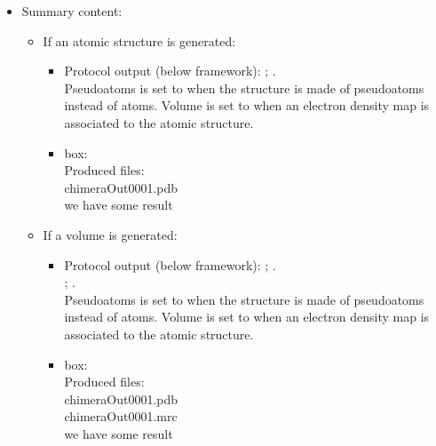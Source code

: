 \begin{itemize}
  \item Summary content:
  
   \begin{itemize}
    \item If an atomic structure is generated:

    \begin{itemize}
     \item Protocol output (below \scipion framework):
      ; .\\Pseudoatoms is set to  when the structure is made of pseudoatoms instead of atoms. Volume is set to  when an electron density map is associated to the atomic structure.\\
     \item {} box:\\Produced files:\\chimeraOut0001.pdb\\we have some result
    \end{itemize}
    \item If a volume is generated:
    
    \begin{itemize}
     \item Protocol output (below \scipion framework):
      ; .\\
      ; .\\Pseudoatoms is set to  when the structure is made of pseudoatoms instead of atoms. Volume is set to  when an electron density map is associated to the atomic structure.
     \item {} box:\\Produced files:\\chimeraOut0001.pdb\\chimeraOut0001.mrc\\we have some result
    \end{itemize}
    
   \end{itemize}
  
 \end{itemize}
